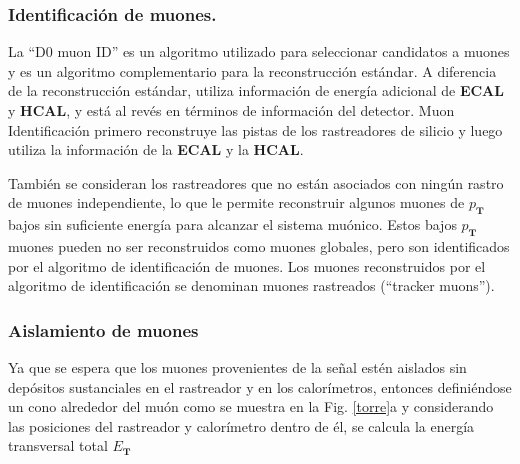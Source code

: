 \subsubsection{Identificación de muones.}

La ``D0 muon ID'' es un algoritmo utilizado para seleccionar candidatos a muones y es un algoritmo complementario para la reconstrucción estándar. A diferencia de la reconstrucción estándar, utiliza información de energía adicional de \textbf{ECAL} y \textbf{HCAL}, y está al revés en términos de información del detector. Muon Identificación primero reconstruye las pistas de los rastreadores de silicio y luego utiliza la información de la \textbf{ECAL} y la \textbf{HCAL}.

También se consideran los rastreadores que no están asociados con ningún rastro de muones independiente, lo que le permite reconstruir algunos muones de $p_\mathbf{T}$ bajos sin suficiente energía para alcanzar el sistema muónico. Estos bajos $p_\mathbf{T}$ muones pueden no ser reconstruidos como muones globales, pero son identificados por el algoritmo de identificación de muones. Los muones reconstruidos por el algoritmo de identificación se denominan muones rastreados (``tracker muons'').

\subsubsection{Aislamiento de muones}


Ya que se espera que los muones provenientes de la señal estén aislados sin depósitos sustanciales en el rastreador y en los calorímetros, entonces definiéndose un cono alrededor del muón como se muestra en la Fig. \ref{torre}a y considerando las posiciones del rastreador y calorímetro dentro de él, se calcula la energía transversal total $E_\mathbf{T}$

